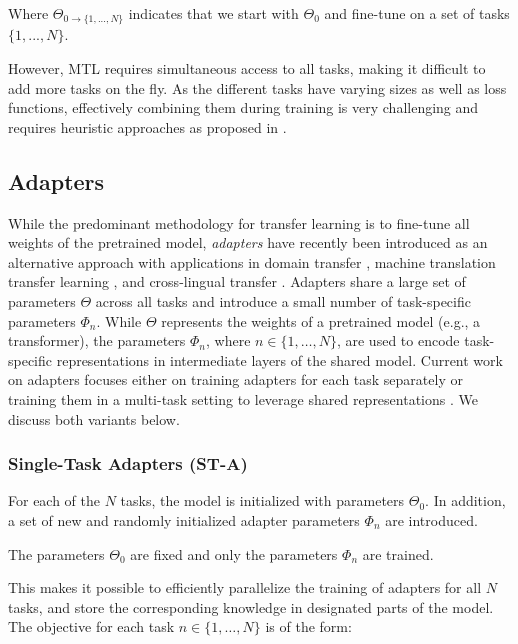 Where $\Theta_{0 \rightarrow \{1, ..., N\}}$ indicates that we start with $\Theta_{0}$ and fine-tune on a set of tasks $\{1, ..., N\}$.

 However, MTL requires simultaneous access to all tasks, making it difficult to add more tasks on the fly. As the different tasks have varying sizes as well as loss functions, effectively combining them during training is very challenging and requires heuristic approaches as proposed in \citet{stickland2019bert}.

\subsection{Adapters}
\label{sec:Adapter_Chapter}

While the predominant methodology for transfer learning is to fine-tune all weights of the pretrained model,
\emph{adapters}  \cite{houlsby2019parameter} have recently been introduced as an alternative approach with applications in domain transfer \cite{rueckle2020MultiCQA}, machine translation \cite{bapna2019simple, Philip20NaverAdapter} transfer learning \cite{stickland2019bert, Wang20kadapters, Lauscher2020comonsense}, and cross-lingual transfer  \cite{ pfeiffer20madx, Pfeiffer20Gib, ustun-etal-2020-udapter, Vidoni2020OrthogonalLA}. Adapters share a large set of parameters $\Theta$  across all tasks and introduce a small number of task-specific parameters $\Phi_n$.
While $\Theta$ represents the weights of a pretrained model (e.g., a transformer), the parameters  $\Phi_n$, where $n \in \{1,\ldots, N\}$, are used to encode task-specific representations in intermediate layers of the shared model. 
\label{sec:conceptual}
Current work on adapters focuses either on training adapters for each task separately  \cite{houlsby2019parameter,bapna2019simple,pfeiffer2020AdapterHub} or training them in a multi-task setting to leverage shared representations \cite{stickland2019bert}. We discuss both variants below.

\subsubsection{Single-Task Adapters (ST-A)} For each of the $N$ tasks, the model is initialized with parameters $\Theta_0$.
In addition, a set of new and randomly initialized adapter parameters  $\Phi_n$ are introduced. 

The parameters $\Theta_0$ are fixed and only the parameters $\Phi_n$ are trained. 

This makes it possible to efficiently parallelize the training of adapters for all $N$ tasks, and store the corresponding knowledge in designated parts of the model. The objective for each task $n \in \{1,\ldots, N\}$ is of the form:

